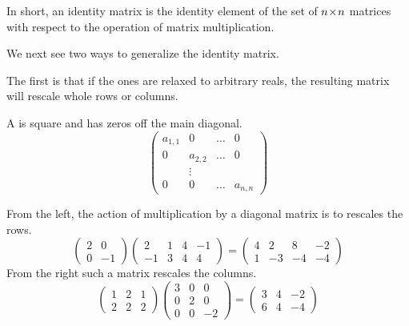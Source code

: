 \noindent In short, an identity matrix is the identity element 
of the set of $n \! \times \! n$ matrices with
respect to the operation of matrix multiplication.

We next see two ways to generalize the identity matrix.

The first is that if the ones are relaxed to arbitrary reals,
the resulting matrix will rescale whole rows or columns.
\begin{definition}
A 
is square and has zeros off the main diagonal.
\begin{equation*}
    \begin{pmatrix}
       a_{1,1}  &0        &\ldots     &0     \\
       0        &a_{2,2}  &\ldots     &0     \\
                &\vdots                      \\
       0        &0        &\ldots     &a_{n,n}
    \end{pmatrix}
\end{equation*}
\end{definition}

\begin{example}
From the left, 
the action of multiplication by a diagonal matrix is to
rescales the rows.
\begin{equation*}
    \begin{pmatrix}
       2  &0   \\
       0  &-1
    \end{pmatrix}
    \begin{pmatrix}
       2  &1  &4  &-1  \\
      -1  &3  &4  &4
    \end{pmatrix}
  =
    \begin{pmatrix}
       4  &2  &8  &-2  \\
       1  &-3 &-4 &-4
    \end{pmatrix}
\end{equation*}
From the right such a matrix rescales the columns.
\begin{equation*}
     \begin{pmatrix}
        1  &2  &1  \\
        2  &2  &2
     \end{pmatrix}
    \begin{pmatrix}
      3  &0  &0  \\
      0  &2  &0  \\
      0  &0  &-2
    \end{pmatrix}
  =
     \begin{pmatrix}
        3  &4  &-2 \\
        6  &4  &-4
     \end{pmatrix}
\end{equation*}
\end{example}

